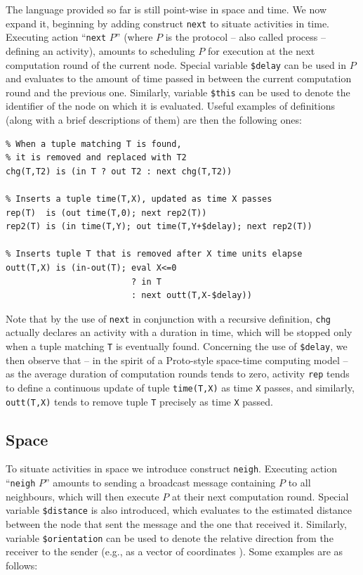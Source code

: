 \documentclass[12pt,a4paper,twoside,openright]{book}
\begin{document}
The language provided so far is still point-wise in space and time.
%
We now expand it, beginning by adding construct \texttt{next} to situate activities in time.
%
Executing action ``\texttt{next} $P$'' (where $P$ is the protocol -- also called process -- defining an activity), amounts to scheduling $P$ for execution at the next computation round of the current node.
%
Special variable \texttt{\$delay} can be used in $P$ and evaluates to the amount of time passed in between the current computation round and the previous one. Similarly, variable \texttt{\$this} can be used to denote the identifier of the node on which it is evaluated.
%
Useful examples of definitions (along with a brief descriptions of them) are then the following ones:
{
\begin{verbatim}
% When a tuple matching T is found,
% it is removed and replaced with T2
chg(T,T2) is (in T ? out T2 : next chg(T,T2))

% Inserts a tuple time(T,X), updated as time X passes
rep(T) 	is (out time(T,0); next rep2(T))
rep2(T) is (in time(T,Y); out time(T,Y+$delay); next rep2(T))

% Inserts tuple T that is removed after X time units elapse
outt(T,X) is (in-out(T); eval X<=0
                         ? in T
                         : next outt(T,X-$delay))
\end{verbatim}
}

\noindent Note that by the use of \texttt{next} in conjunction with a recursive definition, \texttt{chg} actually declares an activity with a duration in time, which will be stopped only when a tuple matching \texttt{T} is eventually found.
%
Concerning the use of \texttt{\$delay}, we then observe that -- in the spirit of a Proto-style space-time computing model -- as the average duration of computation rounds tends to zero, activity \texttt{rep} tends to define a continuous update of tuple \texttt{time(T,X)} as time \texttt{X} passes, and similarly, \texttt{outt(T,X)} tends to remove tuple \texttt{T} precisely as time \texttt{X} passed.

\subsection{Space}

To situate activities in space we introduce construct \texttt{neigh}.
%
Executing action ``\texttt{neigh} $P$'' amounts to sending a broadcast message containing $P$ to all neighbours, which will then execute $P$ at their next computation round.
%
Special variable \texttt{\$distance} is also introduced, which evaluates to the estimated distance between the node that sent the message and the one that received it.
%
Similarly, variable \texttt{\$orientation} can be used to denote the relative direction from the receiver to the sender (e.g., as a vector of coordinates \cite{CardelliG10}).
%
Some examples are as follows:
\end{document}
